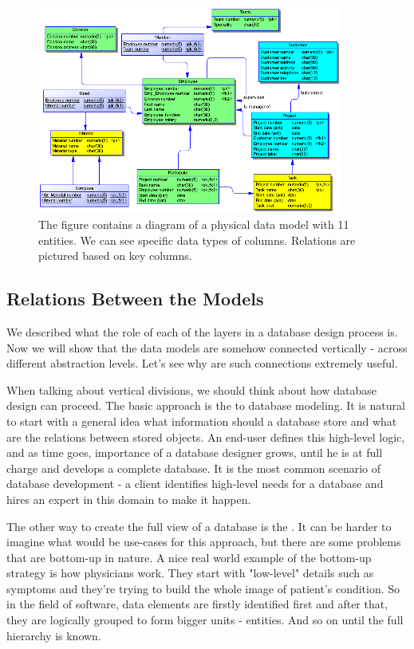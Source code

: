 \begin{figure}[H]
	\centering
	\includegraphics[width=10cm]{../img/Physical_Model_PowerDesigner}
	\caption[Physical diagram\cite{PowerDesignerDocumentation}]{The figure contains a diagram of a physical data model with 11 entities. We can see specific data types of columns. Relations are pictured based on key columns.}
\end{figure}

\subsection{Relations Between the Models}

We described what the role of each of the layers in a database design process is.
Now we will show that the data models are somehow connected vertically - across different abstraction levels. Let's see why are such connections extremely useful.

When talking about vertical divisions, we should think about how database design can proceed.
The basic approach is the  to database modeling.
It is natural to start with a general idea what information should a database store and what are the relations between stored objects. 
An end-user defines this high-level logic, and as time goes, importance of a database designer grows, until he is at full charge and develops a complete database. It is the most common scenario of database development - a client identifies high-level needs for a database and hires an expert in this domain to make it happen.

The other way to create the full view of a database is the . It can be harder to imagine what would be use-cases for this approach, but there are some problems that are bottom-up in nature. A nice real world example of the bottom-up strategy is how physicians work. 
They start with "low-level" details such as symptoms and they're trying to build the whole image of patient's condition. So in the field of software, data elements are firstly identified first and after that, they are logically grouped to form bigger units - entities. And so on until the full hierarchy is known.

